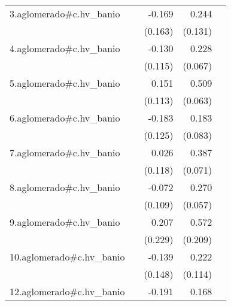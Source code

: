 {\begin{longtable}{l*{4}{D{.}{.}{-1}}}
\addlinespace
3.aglomerado#c.hv\_banio&                     &      -0.169         &       0.244         &                     \\
            &                     &     (0.163)         &     (0.131)         &                     \\
\addlinespace
4.aglomerado#c.hv\_banio&                     &      -0.130         &       0.228\sym{***}&                     \\
            &                     &     (0.115)         &     (0.067)         &                     \\
\addlinespace
5.aglomerado#c.hv\_banio&                     &       0.151         &       0.509\sym{***}&                     \\
            &                     &     (0.113)         &     (0.063)         &                     \\
\addlinespace
6.aglomerado#c.hv\_banio&                     &      -0.183         &       0.183\sym{*}  &                     \\
            &                     &     (0.125)         &     (0.083)         &                     \\
\addlinespace
7.aglomerado#c.hv\_banio&                     &       0.026         &       0.387\sym{***}&                     \\
            &                     &     (0.118)         &     (0.071)         &                     \\
\addlinespace
8.aglomerado#c.hv\_banio&                     &      -0.072         &       0.270\sym{***}&                     \\
            &                     &     (0.109)         &     (0.057)         &                     \\
\addlinespace
9.aglomerado#c.hv\_banio&                     &       0.207         &       0.572\sym{**} &                     \\
            &                     &     (0.229)         &     (0.209)         &                     \\
\addlinespace
10.aglomerado#c.hv\_banio&                     &      -0.139         &       0.222         &                     \\
            &                     &     (0.148)         &     (0.114)         &                     \\
\addlinespace
12.aglomerado#c.hv\_banio&                     &      -0.191         &       0.168         &                     \\

\end{longtable}}
